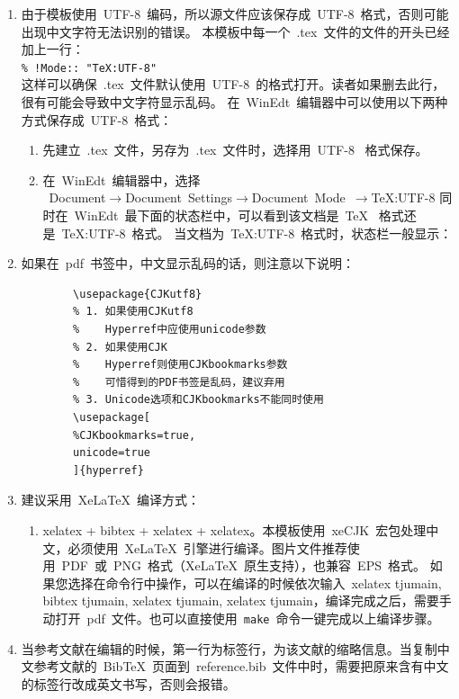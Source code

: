 \begin{enumerate}
  \item 由于模板使用~UTF-8~编码，所以源文件应该保存成~UTF-8~格式，否则可能出现中文字符无法识别的错误。
  本模板中每一个~.tex~文件的文件的开头已经加上一行：\\
  \verb|% !Mode:: "TeX:UTF-8"|\\
     这样可以确保~.tex~文件默认使用~UTF-8~的格式打开。读者如果删去此行，很有可能会导致中文字符显示乱码。
     在~WinEdt~编辑器中可以使用以下两种方式保存成~UTF-8~格式：
      \begin{enumerate}
        \item 先建立~.tex~文件，另存为~.tex~文件时，选择用~UTF-8~ 格式保存。
        \item
            在~WinEdt~编辑器中，选择\\
            \mbox{~Document$\rightarrow$Document Settings$\rightarrow$Document Mode $\rightarrow$TeX:UTF-8} 同时在~WinEdt~最下面的状态栏中，可以看到该文档是~TeX~ 格式还是~TeX:UTF-8~格式。
            当文档为~TeX:UTF-8~格式时，状态栏一般显示：
      \end{enumerate}
  \item 如果在~pdf~书签中，中文显示乱码的话，则注意以下说明：
    \begin{verbatim}
        \usepackage{CJKutf8}
        % 1. 如果使用CJKutf8
        %    Hyperref中应使用unicode参数
        % 2. 如果使用CJK
        %    Hyperref则使用CJKbookmarks参数
        %    可惜得到的PDF书签是乱码，建议弃用
        % 3. Unicode选项和CJKbookmarks不能同时使用
        \usepackage[
        %CJKbookmarks=true,
        unicode=true
        ]{hyperref}
     \end{verbatim}
  \item 建议采用~XeLaTeX~编译方式：
  \begin{enumerate}
    \item xelatex + bibtex + xelatex + xelatex。本模板使用~xeCJK~宏包处理中文，必须使用~XeLaTeX~引擎进行编译。图片文件推荐使用~PDF~或~PNG~格式（XeLaTeX~原生支持），也兼容~EPS~格式。
          如果您选择在命令行中操作，可以在编译的时候依次输入~xelatex tjumain, bibtex tjumain, xelatex tjumain, xelatex tjumain，编译完成之后，需要手动打开~pdf~文件。也可以直接使用~\verb|make|~命令一键完成以上编译步骤。
  \end{enumerate}
    \item  当参考文献在编辑的时候，第一行为标签行，为该文献的缩略信息。当复制中文参考文献的~BibTeX~页面到~reference.bib~文件中时，需要把原来含有中文的标签行改成英文书写，否则会报错。
\end{enumerate}

